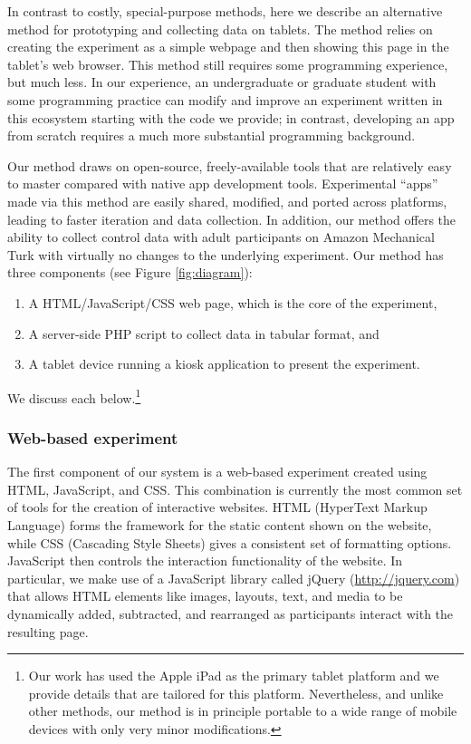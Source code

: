 \documentclass[man,noapacite]{apa2}
\begin{document}
In contrast to costly, special-purpose methods, here we describe an alternative method for prototyping and collecting data on tablets. The method relies on creating the experiment as a simple webpage and then showing this page in the tablet's web browser. This method still requires some programming experience, but much less. In our experience, an undergraduate or graduate student with some programming practice can modify and improve an experiment written in this ecosystem starting with the code we provide; in contrast, developing an app from scratch requires a much more substantial programming background.

Our method draws on open-source, freely-available tools that are relatively easy to master compared with native app development tools. Experimental ``apps'' made via this method are easily shared, modified, and ported across platforms, leading to faster iteration and data collection. In addition, our method offers the ability to collect control data with adult participants on Amazon Mechanical Turk \cite{paolacci2010,crump2013} with virtually no changes to the underlying experiment. Our method has three components (see Figure \ref{fig:diagram}):

\begin{enumerate}
\item A HTML/JavaScript/CSS web page, which is the core of the experiment, 
\item A server-side PHP script to collect data in tabular format, and
\item A tablet device running a kiosk application to present the experiment. 
\end{enumerate}

\noindent We discuss each below.\footnote{Our work has used the Apple iPad as the primary tablet platform and we provide details that are tailored for this platform. Nevertheless, and unlike other methods, our method is in principle portable to a wide range of mobile devices with only very minor modifications.}

\subsubsection{Web-based experiment}

The first component of our system is a web-based experiment created using HTML, JavaScript, and CSS. This combination is currently the most common set of tools for the creation of interactive websites. HTML (HyperText Markup Language) forms the framework for the static content shown on the website, while CSS (Cascading Style Sheets) gives a consistent set of formatting options. JavaScript then controls the interaction functionality of the website. In particular, we make use of a JavaScript library called jQuery (\url{http://jquery.com}) that allows HTML elements like images, layouts, text, and media to be dynamically added, subtracted, and rearranged as participants interact with the resulting page. 
\end{document}

